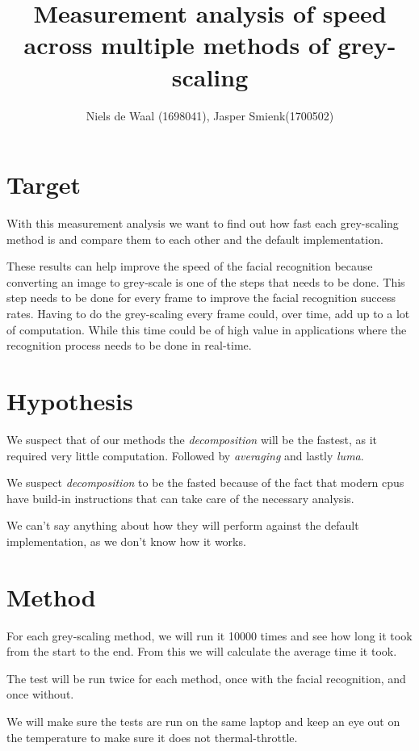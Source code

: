 \documentclass[a4paper]{article}
\begin{document}
\title{Measurement analysis of speed across multiple methods of grey-scaling}
\author{Niels de Waal (1698041), Jasper Smienk(1700502)}
\maketitle
\newpage

\tableofcontents
\newpage

\section{Target}
With this measurement analysis we want to find out how fast each grey-scaling method is and compare them to each other and the default implementation.

These results can help improve the speed of the facial recognition because converting an image to grey-scale is one of the steps that needs to be done. This step needs to be done for every frame to improve the facial recognition success rates. Having to do the grey-scaling every frame could, over time, add up to a lot of computation. While this time could be of high value in applications where the recognition process needs to be done in real-time.

\section{Hypothesis}
We suspect that of our methods the \textit{decomposition} will be the fastest, as it required very little computation. Followed by \textit{averaging} and lastly \textit{luma}.

We suspect \textit{decomposition} to be the fasted because of the fact that modern cpus have build-in instructions that can take care of the necessary analysis.

We can't say anything about how they will perform against the default implementation, as we don't know how it works.

\section{Method}
For each grey-scaling method, we will run it 10000 times and see how long it took from the start to the end. From this we will calculate the average time it took.

The test will be run twice for each method, once with the facial recognition, and once without.

We will make sure the tests are run on the same laptop and keep an eye out on the temperature to make sure it does not thermal-throttle.
\end{document}
